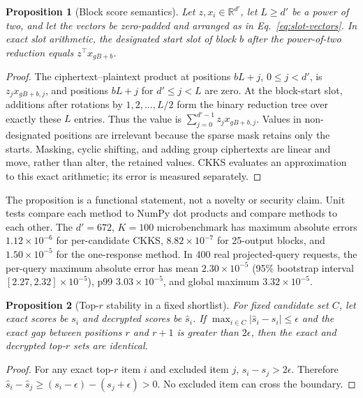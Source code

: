 \documentclass[pdflatex,sn-basic,Numbered]{sn-jnl}
\newcommand{\R}{\mathbb{R}}
\theoremstyle{plain}
\newtheorem{proposition}{Proposition}
\begin{document}
\begin{proposition}[Block score semantics]\label{prop:block-score}
Let $z,x_i\in\R^{d'}$, let $L\geq d'$ be a power of two, and let the vectors be zero-padded and arranged as in Eq.~\eqref{eq:slot-vectors}. In exact slot arithmetic, the designated start slot of block $b$ after the power-of-two reduction equals $z^\top x_{gB+b}$.
\end{proposition}

\begin{proof}
The ciphertext--plaintext product at positions $bL+j$, $0\leq j<d'$, is $z_jx_{gB+b,j}$, and positions $bL+j$ for $d'\leq j<L$ are zero. At the block-start slot, additions after rotations by $1,2,\ldots,L/2$ form the binary reduction tree over exactly these $L$ entries. Thus the value is $\sum_{j=0}^{d'-1}z_jx_{gB+b,j}$. Values in non-designated positions are irrelevant because the sparse mask retains only the starts. Masking, cyclic shifting, and adding group ciphertexts are linear and move, rather than alter, the retained values. CKKS evaluates an approximation to this exact arithmetic; its error is measured separately.
\end{proof}

The proposition is a functional statement, not a novelty or security claim. Unit tests compare each method to NumPy dot products and compare methods to each other. The $d'=672$, $K=100$ microbenchmark has maximum absolute errors $1.12\times10^{-6}$ for per-candidate CKKS, $8.82\times10^{-7}$ for 25-output blocks, and $1.50\times10^{-5}$ for the one-response method. In 400 real projected-query requests, the per-query maximum absolute error has mean $2.30\times10^{-5}$ (95\% bootstrap interval $[2.27,2.32]\times10^{-5}$), p99 $3.03\times10^{-5}$, and global maximum $3.32\times10^{-5}$.

\begin{proposition}[Top-$r$ stability in a fixed shortlist]\label{prop:ranking}
For fixed candidate set $C$, let exact scores be $s_i$ and decrypted scores be $\hat s_i$. If $\max_{i\in C}|\hat s_i-s_i|\leq\epsilon$ and the exact gap between positions $r$ and $r+1$ is greater than $2\epsilon$, then the exact and decrypted top-$r$ sets are identical.
\end{proposition}

\begin{proof}
For any exact top-$r$ item $i$ and excluded item $j$, $s_i-s_j>2\epsilon$. Therefore $\hat s_i-\hat s_j\geq(s_i-\epsilon)-(s_j+\epsilon)>0$. No excluded item can cross the boundary.
\end{proof}
\end{document}
